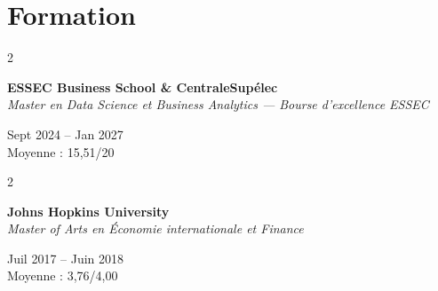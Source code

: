 \documentclass[10pt, letterpaper]{article}
\newenvironment{twocolentry}[2][]{
    \onecolentry
    \def\secondColumn{#2}
    \setcolumnwidth{\fill, 3.8 cm}
    \begin{paracol}{2}
}{
    \switchcolumn \raggedleft \secondColumn
    \end{paracol}
    \endonecolentry
} %
\begin{document}

    \vspace{0.2 cm}

    \section{Formation}
        \begin{twocolentry}{Sept 2024 – Jan 2027 \\ Moyenne : 15,51/20}
            \textbf{ESSEC Business School \& CentraleSupélec} \\
            \textit{Master en Data Science et Business Analytics — Bourse d'excellence ESSEC}
        \end{twocolentry}

        \vspace{0.2 cm}

        \begin{twocolentry}{Juil 2017 – Juin 2018 \\ Moyenne : 3,76/4,00}
            \textbf{Johns Hopkins University} \\
            \textit{Master of Arts en Économie internationale et Finance}
        \end{twocolentry}

        \vspace{0.2 cm}
\end{document}

